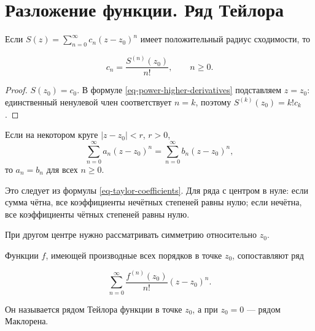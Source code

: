 \section{Разложение функции. Ряд Тейлора}\label{sec-power-series-04}

\begin{theorem}\label{thm-power-coefficients}

Если \(S(z)=\sum_{n=0}^\infty c_n(z-z_0)^n\) имеет положительный радиус сходимости, то

\begin{equation}
c_n=\frac{S^{(n)}(z_0)}{n!},\qquad n\ge0.
\label{eq-taylor-coefficients}
\end{equation}

\end{theorem}

\begin{proof}

\(S(z_0)=c_0\). В формуле \eqref{eq-power-higher-derivatives} подставляем \(z=z_0\): единственный ненулевой член соответствует \(n=k\), поэтому \(S^{(k)}(z_0)=k!c_k\).

\end{proof}

\begin{cor}\label{cor-power-uniqueness}

Если на некотором круге \(|z-z_0|<r\), \(r>0\), \[
\sum_{n=0}^\infty a_n(z-z_0)^n
=\sum_{n=0}^\infty b_n(z-z_0)^n,
\] то \(a_n=b_n\) для всех \(n\ge0\).

\end{cor}

Это следует из формулы \eqref{eq-taylor-coefficients}. Для ряда с центром в нуле: если сумма чётна, все коэффициенты нечётных степеней равны нулю; если нечётна, все коэффициенты чётных степеней равны нулю.

При другом центре нужно рассматривать симметрию относительно \(z_0\).

\begin{definition}\label{def-taylor-series}

Функции \(f\), имеющей производные всех порядков в точке \(z_0\), сопоставляют ряд

\begin{equation}
\sum_{n=0}^\infty\frac{f^{(n)}(z_0)}{n!}(z-z_0)^n.
\label{eq-taylor-series}
\end{equation}

Он называется рядом Тейлора функции в точке \(z_0\), а при \(z_0=0\) --- рядом Маклорена.

\end{definition}

